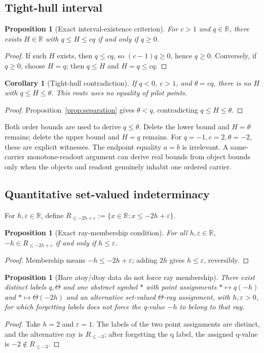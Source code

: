 \documentclass[11pt]{article}
\newtheorem{proposition}[theorem]{Proposition}
\newtheorem{corollary}[theorem]{Corollary}
\begin{document}
\subsection{Tight-hull interval}
\begin{proposition}[Exact interval-existence criterion]\label{prop:interval}
For $c>1$ and $q\in\mathbb R$, there exists $H\in\mathbb R$ with $q\leq H\leq cq$ if and only if $q\geq0$.
\end{proposition}
\begin{proof}
If such $H$ exists, then $q\leq cq$, so $(c-1)q\geq0$, hence $q\geq0$. Conversely, if $q\geq0$, choose $H=q$; then $q\leq H$ and $H=q\leq cq$.
\end{proof}
\begin{corollary}[Tight-hull contradiction]\label{cor:hull}
If $q<0$, $c>1$, and $\theta=cq$, there is no $H$ with $q\leq H\leq\theta$. This route uses no equality of pilot points.
\end{corollary}
\begin{proof}
Proposition~\ref{prop:separation} gives $\theta<q$, contradicting $q\leq H\leq\theta$.
\end{proof}
Both order bounds are used to derive $q\leq\theta$. Delete the lower bound and $H=\theta$ remains; delete the upper bound and $H=q$ remains. For $q=-1,c=2,\theta=-2$, these are explicit witnesses. The endpoint equality $a=b$ is irrelevant. A same-carrier monotone-readout argument can derive real bounds from object bounds only when the objects and readout genuinely inhabit one ordered carrier.

\subsection{Quantitative set-valued indeterminacy}
For $h,\varepsilon\in\mathbb R$, define $R_{\leq -2h+\varepsilon}:=\{x\in\mathbb R:x\leq-2h+\varepsilon\}$.
\begin{proposition}[Exact ray-membership condition]\label{prop:ray}
For all $h,\varepsilon\in\mathbb R$, $-h\in R_{\leq-2h+\varepsilon}$ if and only if $h\leq\varepsilon$.
\end{proposition}
\begin{proof}
Membership means $-h\leq-2h+\varepsilon$; adding $2h$ gives $h\leq\varepsilon$, reversibly.
\end{proof}
\begin{proposition}[Bare atoy/dtoy data do not force ray membership]\label{prop:ray-countermodel}
There exist distinct labels $q,\Theta$ and one abstract symbol $*$ with point assignments $*\mapsto q(-h)$ and $*\mapsto\Theta(-2h)$ and an alternative set-valued $\Theta$-ray assignment, with $h,\varepsilon>0$, for which forgetting labels does not force the q-value $-h$ to belong to that ray.
\end{proposition}
\begin{proof}
Take $h=2$ and $\varepsilon=1$. The labels of the two point assignments are distinct, and the alternative ray is $R_{\leq-3}$; after forgetting the q label, the assigned q-value is $-2\notin R_{\leq-3}$.
\end{proof}
\end{document}
